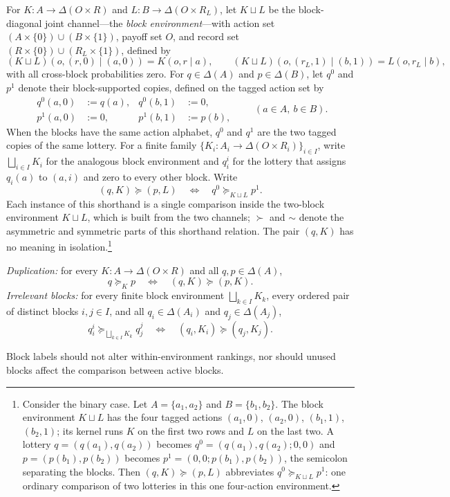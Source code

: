 \documentclass[11pt,a4paper]{article}
\theoremstyle{definition}
\newcommand{\D}{\Delta}
\newcommand{\1}{\mathbf 1}
\begin{document}
For
$K:A\to\D(O\times R)$ and $L:B\to\D(O\times R_L)$, let $K\sqcup L$ be the block-diagonal joint channel---the
\emph{block environment}---with action set
$(A\times\{0\})\cup(B\times\{1\})$, payoff set $O$, and record set
$(R\times\{0\})\cup(R_L\times\{1\})$, defined by
\[
 (K\sqcup L)(o,(r,0)\mid(a,0))=K(o,r\mid a),
 \qquad
 (K\sqcup L)(o,(r_L,1)\mid(b,1))=L(o,r_L\mid b),
\]
with all cross-block probabilities zero.  For $q\in\D(A)$ and $p\in\D(B)$, let $q^0$ and $p^1$ denote their
block-supported copies, defined on the tagged action set by
\[
\begin{aligned}
 q^0(a,0)&:=q(a), & q^0(b,1)&:=0,\\
 p^1(a,0)&:=0,    & p^1(b,1)&:=p(b),
\end{aligned}
\qquad(a\in A,\ b\in B).
\]
When the blocks have the same action alphabet, $q^0$ and $q^1$ are
the two tagged copies of the same lottery.  For a finite family
$\{K_i:A_i\to\D(O\times R_i)\}_{i\in I}$, write $\bigsqcup_{i\in I}K_i$ for the analogous block environment and
$q_i^i$ for the lottery that assigns $q_i(a)$ to $(a,i)$ and zero to every other block.  Write
\[
 (q,K)\succeq(p,L)
 \quad\Longleftrightarrow\quad
 q^0\succeq_{K\sqcup L}p^1.
\]
Each instance of this shorthand is a single comparison inside the two-block environment $K\sqcup L$, which is
built from the two channels; $\succ$ and $\sim$ denote the asymmetric and symmetric parts of this shorthand
relation.  The pair $(q,K)$
has no meaning in isolation.\footnote{Consider the binary case.  Let $A=\{a_1,a_2\}$ and $B=\{b_1,b_2\}$.
The block environment $K\sqcup L$ has the four tagged actions $(a_1,0)$, $(a_2,0)$, $(b_1,1)$, $(b_2,1)$; its
kernel runs $K$ on the first two rows and $L$ on the last two.  A lottery $q=(q(a_1),q(a_2))$ becomes
$q^0=(q(a_1),q(a_2);0,0)$ and $p=(p(b_1),p(b_2))$ becomes $p^1=(0,0;p(b_1),p(b_2))$, the semicolon separating
the blocks.  Then $(q,K)\succeq(p,L)$ abbreviates $q^0\succeq_{K\sqcup L}p^1$: one ordinary comparison of two
lotteries in this one four-action environment.}

\begin{description}[leftmargin=*,style=sameline]

\item[(A3) Block-comparison coherence.]
\label{ax:block-coherence}
\emph{Duplication:} for every $K:A\to\D(O\times R)$ and all $q,p\in\D(A)$,
\[
 q\succeq_Kp
 \quad\Longleftrightarrow\quad
 (q,K)\succeq(p,K).
\]
\emph{Irrelevant blocks:} for every finite block environment $\bigsqcup_{k\in I}K_k$, every ordered pair of
distinct blocks $i,j\in I$, and all $q_i\in\D(A_i)$ and $q_j\in\D(A_j)$,
\[
 q_i^i\succeq_{\bigsqcup_{k\in I}K_k}q_j^j
 \quad\Longleftrightarrow\quad
 (q_i,K_i)\succeq(q_j,K_j).
\]

Block labels should not alter within-environment rankings, nor should unused blocks affect the comparison between
active blocks.

\end{description}
\end{document}
